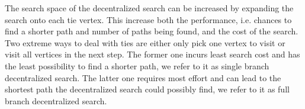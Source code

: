 The search space of the decentralized search can be increased by expanding the search onto each tie vertex. This increase both the performance, i.e. chances to find a shorter path and number of paths being found, and the cost of the search. Two extreme ways to deal with ties are either only pick one vertex to visit or visit all vertices in the next step. The former one incurs least search cost and has the least possibility to find a shorter path, we refer to it as single branch decentralized search. The latter one requires most effort and can lead to the shortest path the decentralized search could possibly find, we refer to it as full branch decentralized search. 
